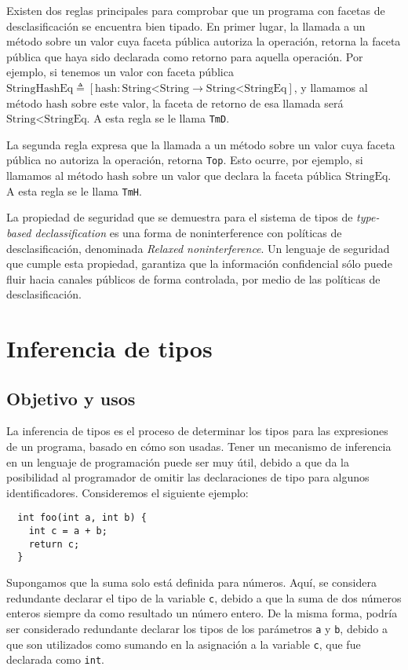 Existen dos reglas principales para comprobar que un programa con facetas de desclasificación se encuentra bien tipado. En primer lugar, la llamada a un método sobre un valor cuya faceta pública autoriza la operación, retorna la faceta pública que haya sido declarada como retorno para aquella operación. Por ejemplo, si tenemos un valor con faceta pública $\text{StringHashEq} \triangleq [\text{hash} : \text{String<String} \rightarrow \text{String<StringEq}]$, y llamamos al método $\text{hash}$ sobre este valor, la faceta de retorno de esa llamada será $\text{String<StringEq}$. A esta regla se le llama \texttt{TmD}.

La segunda regla expresa que la llamada a un método sobre un valor cuya faceta pública no autoriza la operación, retorna \texttt{Top}. Esto ocurre, por ejemplo, si llamamos al método $\text{hash}$ sobre un valor que declara la faceta pública $\text{StringEq}$. A esta regla se le llama \texttt{TmH}.

La propiedad de seguridad que se demuestra para el sistema de tipos de \textit{type-based declassification} es una forma de noninterference con políticas de desclasificación, denominada \textit{Relaxed noninterference}. Un lenguaje de seguridad que cumple esta propiedad, garantiza que la información confidencial sólo puede fluir hacia canales públicos de forma controlada, por medio de las políticas de desclasificación.

\section{Inferencia de tipos}
\subsection{Objetivo y usos}
La inferencia de tipos es el proceso de determinar los tipos para las expresiones de un programa, basado en cómo son usadas. Tener un mecanismo de inferencia en un lenguaje de programación puede ser muy útil, debido a que da la posibilidad al programador de omitir las declaraciones de tipo para algunos identificadores. Consideremos el siguiente ejemplo:

\begin{lstlisting}
  int foo(int a, int b) {
    int c = a + b;
    return c;
  }
\end{lstlisting}

Supongamos que la suma solo está definida para números. Aquí, se considera redundante declarar el tipo de la variable \texttt{c}, debido a que la suma de dos números enteros siempre da como resultado un número entero. De la misma forma, podría ser considerado redundante declarar los tipos de los parámetros \texttt{a} y \texttt{b}, debido a que son utilizados como sumando en la asignación a la variable \texttt{c}, que fue declarada como \texttt{int}.

